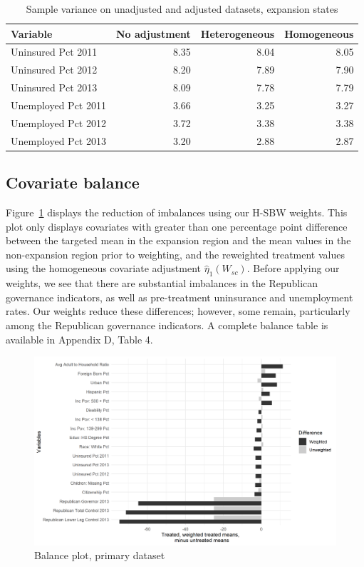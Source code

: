 \documentclass[aoas]{imsart}
\theoremstyle{plain}
\theoremstyle{remark}
\begin{document}
\begin{table}[ht]
\caption{Sample variance on unadjusted and adjusted datasets, expansion states}
\label{tab:adjust1}
\begin{tabular}{lrrr}
  \hline
Variable & No adjustment & Heterogeneous & Homogeneous \\ 
  \hline
Uninsured Pct 2011 & 8.35 & 8.04 & 8.05 \\ 
  Uninsured Pct 2012 & 8.20 & 7.89 & 7.90 \\ 
  Uninsured Pct 2013 & 8.09 & 7.78 & 7.79 \\ 
  Unemployed Pct 2011 & 3.66 & 3.25 & 3.27 \\ 
  Unemployed Pct 2012 & 3.72 & 3.38 & 3.38 \\ 
  Unemployed Pct 2013 & 3.20 & 2.88 & 2.87 \\ 
   \hline
\end{tabular}
\end{table}

\subsection{Covariate balance}

Figure~\ref{fig:loveplotc1} displays the reduction of imbalances using our H-SBW weights. This plot only displays covariates with greater than one percentage point difference between the targeted mean in the expansion region and the mean values in the non-expansion region prior to weighting, and the reweighted treatment values using the homogeneous covariate adjustment $\hat{\eta}_1(W_{sc})$. Before applying our weights, we see that there are substantial imbalances in the Republican governance indicators, as well as pre-treatment uninsurance and unemployment rates. Our weights reduce these differences; however, some remain, particularly among the Republican governance indicators. A complete balance table is available in Appendix D, Table 4. 

\begin{figure}[H]
\begin{center}
    \caption{Balance plot, primary dataset}
    \label{fig:loveplotc1}
    \includegraphics[scale=0.5]{01_Plots/balance-plot-etuc1.png}
\end{center}
\end{figure}
\end{document}
